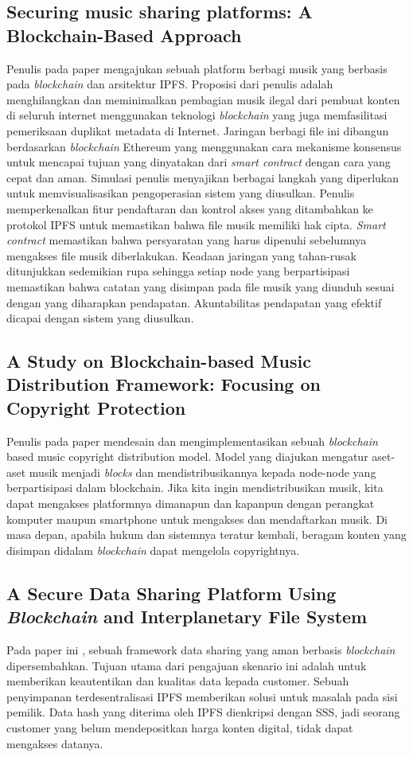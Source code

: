 \subsection{Securing music sharing platforms: A Blockchain-Based Approach}
Penulis pada paper \parencite{adjei2021securing} mengajukan sebuah platform berbagi musik yang berbasis pada \emph{blockchain} dan arsitektur IPFS. 
Proposisi dari penulis adalah menghilangkan dan meminimalkan pembagian musik ilegal dari pembuat konten di seluruh
internet menggunakan teknologi \emph{blockchain} yang juga memfasilitasi pemeriksaan duplikat metadata di
Internet. Jaringan berbagi file ini dibangun berdasarkan \emph{blockchain} Ethereum yang menggunakan
cara mekanisme konsensus untuk mencapai tujuan yang dinyatakan dari \emph{smart contract} dengan cara yang cepat dan aman.
Simulasi penulis menyajikan berbagai langkah yang diperlukan untuk memvisualisasikan pengoperasian sistem yang diusulkan. Penulis memperkenalkan fitur pendaftaran dan kontrol akses yang ditambahkan ke protokol IPFS untuk memastikan bahwa
file musik memiliki hak cipta. \emph{Smart contract} memastikan bahwa persyaratan yang harus dipenuhi sebelumnya
mengakses file musik diberlakukan. Keadaan jaringan yang tahan-rusak ditunjukkan sedemikian rupa sehingga
setiap node yang berpartisipasi memastikan bahwa catatan yang disimpan pada file musik yang diunduh sesuai dengan yang diharapkan
pendapatan. Akuntabilitas pendapatan yang efektif dicapai dengan sistem yang diusulkan.

\subsection{A Study on Blockchain-based Music Distribution Framework: Focusing on Copyright Protection}

Penulis pada paper \parencite{kim2020study} mendesain dan mengimplementasikan sebuah \emph{blockchain} based music copyright distribution model.
Model yang diajukan mengatur aset-aset musik menjadi \emph{blocks} dan mendistribusikannya kepada node-node yang berpartisipasi dalam blockchain.
Jika kita ingin mendistribusikan musik, kita dapat mengakses platformnya dimanapun dan kapanpun dengan perangkat komputer maupun smartphone untuk mengakses dan
mendaftarkan musik. Di masa depan, apabila hukum dan sistemnya teratur kembali, beragam konten yang disimpan didalam \emph{blockchain} dapat mengelola copyrightnya.

\subsection{A Secure Data Sharing Platform Using \emph{Blockchain} and Interplanetary File System}
Pada paper ini \parencite{naz2019secure}, sebuah framework data sharing yang aman berbasis \emph{blockchain} dipersembahkan. Tujuan utama dari pengajuan skenario ini adalah untuk 
memberikan keautentikan dan kualitas data kepada customer. Sebuah penyimpanan terdesentralisasi IPFS memberikan solusi untuk masalah pada sisi pemilik.
Data hash yang diterima oleh IPFS dienkripsi dengan SSS, jadi seorang customer yang belum mendepositkan harga konten digital, tidak dapat mengakses datanya.

